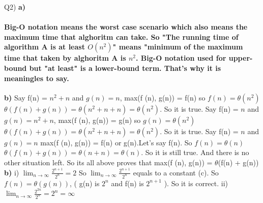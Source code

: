 \documentclass{article}
\begin{document}
Q2)
\newline
\textbf{a)}
\newline
\paragraph{
Big-O notation means the worst case scenario which also means the maximum time that alghoritm can take.  So "The running time of algorithm A is at least $O(n^2)$" means "minimum of the maximum time that taken by alghoritm A is $n^2$. Big-O notation used for upper-bound but "at least" is a lower-bound term. That's why it is meaningles to say.
\newline
}
\textbf{b)}
\newline
Say f(n) = $n^2+n$ and $g(n) = n$,
\newline
max(f (n), g(n)) = f(n) so $ f(n) = \theta (n^2)$
\newline
$\theta (f(n) + g(n)) = \theta (n^2+n + n) = \theta (n^2)$. So it is true.
\newline
\newline
Say f(n) = $n$  and $g(n) = n^2+n$,
\newline
max(f (n), g(n)) = g(n) so $ g(n) = \theta (n^2)$
\newline
$\theta (f(n) + g(n)) = \theta (n^2+n + n) = \theta (n^2)$. So it is true.
\newline
\newline
Say f(n) = $n$ and $g(n) = n$
\newline
max(f (n), g(n)) = f(n) or g(n).Let's say f(n). So $ f(n) = \theta (n)$
\newline
$\theta (f(n) + g(n)) = \theta (n + n) = \theta (n)$. So it is still true.
\newline
\newline
And there is no other situation left. So its all above proves that max(f (n), g(n)) = $\theta$(f(n) + g(n))
\newline
\newline
\textbf{b)}
i) $\lim_{n \to \infty} \frac{2^{n+1}}{2^n} = 2$ 
\newline
So $\lim_{n \to \infty} \frac{2^{n+1}}{2^n}$ equals to a constant (c).
\newline
So $f(n) = \theta (g(n))$, ( g(n) is $2^n$ and f(n) is $2^{n+1}$ ).
\newline
So it is correct.
\newline
\newline
ii) $\lim_{n \to \infty} \frac{2^{2n}}{2^n} = 2^n = \infty$ 
\newline
\end{document}
